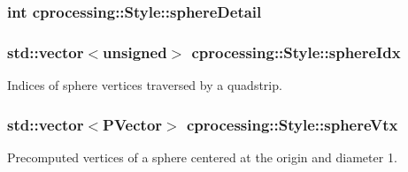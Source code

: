 \hypertarget{classcprocessing_1_1Style_ae4228a0d8904da20016816b72773722e}{
\subsubsection[{sphere\-Detail}]{\setlength{\rightskip}{0pt plus 5cm}int {\bf cprocessing\-::\-Style\-::sphere\-Detail}}}\label{classcprocessing_1_1Style_ae4228a0d8904da20016816b72773722e}
\hypertarget{classcprocessing_1_1Style_a591c6314312702ff1ef3605fd667b37e}{
\subsubsection[{sphere\-Idx}]{\setlength{\rightskip}{0pt plus 5cm}std\-::vector$<$unsigned$>$ {\bf cprocessing\-::\-Style\-::sphere\-Idx}}}\label{classcprocessing_1_1Style_a591c6314312702ff1ef3605fd667b37e}


\-Indices of sphere vertices traversed by a quadstrip. 

\hypertarget{classcprocessing_1_1Style_a03aa1c2223d266bf0936c667a52c3800}{
\subsubsection[{sphere\-Vtx}]{\setlength{\rightskip}{0pt plus 5cm}std\-::vector$<${\bf \-P\-Vector}$>$ {\bf cprocessing\-::\-Style\-::sphere\-Vtx}}}\label{classcprocessing_1_1Style_a03aa1c2223d266bf0936c667a52c3800}


\-Precomputed vertices of a sphere centered at the origin and diameter 1. 

